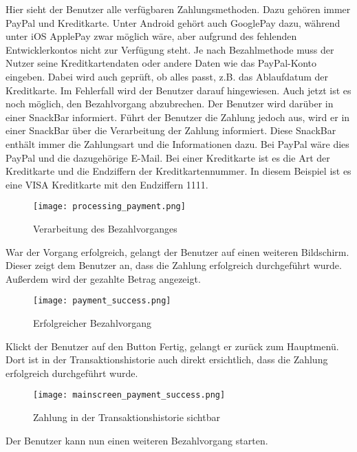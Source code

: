 Hier sieht der Benutzer alle verfügbaren Zahlungsmethoden.
Dazu gehören immer PayPal und Kreditkarte.
Unter Android gehört auch GooglePay dazu, während unter iOS ApplePay zwar möglich wäre, aber aufgrund des fehlenden Entwicklerkontos nicht zur Verfügung steht.
Je nach Bezahlmethode muss der Nutzer seine Kreditkartendaten oder andere Daten wie das PayPal-Konto eingeben.
Dabei wird auch geprüft, ob alles passt, z.B. das Ablaufdatum der Kreditkarte.
Im Fehlerfall wird der Benutzer darauf hingewiesen.
Auch jetzt ist es noch möglich, den Bezahlvorgang abzubrechen.
Der Benutzer wird darüber in einer SnackBar informiert.
Führt der Benutzer die Zahlung jedoch aus, wird er in einer SnackBar über die Verarbeitung der Zahlung informiert.
Diese SnackBar enthält immer die Zahlungsart und die Informationen dazu.
Bei PayPal wäre dies PayPal und die dazugehörige E-Mail.
Bei einer Kreditkarte ist es die Art der Kreditkarte und die Endziffern der Kreditkartennummer.
In diesem Beispiel ist es eine VISA Kreditkarte mit den Endziffern 1111.

\begin{figure}[H]
  \centering
  \texttt{[image: processing\_payment.png]}
  \caption{Verarbeitung des Bezahlvorganges}
\end{figure}

War der Vorgang erfolgreich, gelangt der Benutzer auf einen weiteren Bildschirm.
Dieser zeigt dem Benutzer an, dass die Zahlung erfolgreich durchgeführt wurde.
Außerdem wird der gezahlte Betrag angezeigt.

\begin{figure}[H]
  \centering
  \texttt{[image: payment\_success.png]}
  \caption{Erfolgreicher Bezahlvorgang}
\end{figure}

Klickt der Benutzer auf den Button Fertig, gelangt er zurück zum Hauptmenü.
Dort ist in der Transaktionshistorie auch direkt ersichtlich, dass die Zahlung erfolgreich durchgeführt wurde.

\begin{figure}[H]
  \centering
  \texttt{[image: mainscreen\_payment\_success.png]}
  \caption{Zahlung in der Transaktionshistorie sichtbar}
\end{figure}

Der Benutzer kann nun einen weiteren Bezahlvorgang starten.

